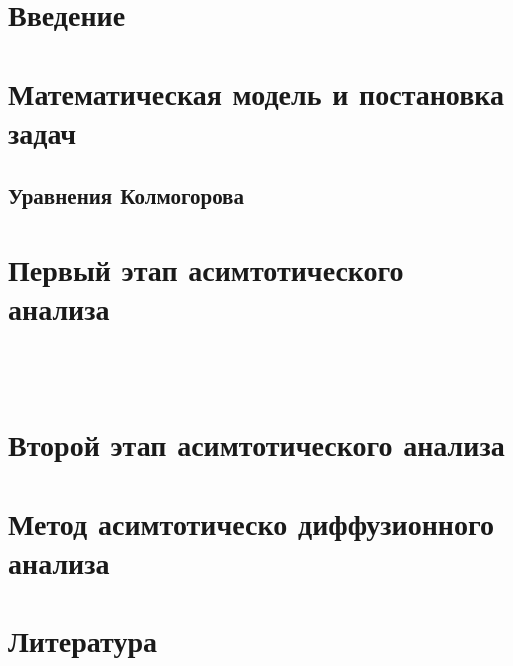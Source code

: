 \documentclass[a4paper,12pt]{article}
\begin{document}
	
	\newpage

	\tableofcontents
	\newpage
	

\section{Введение}

	
	\newpage
	

\section{Математическая модель и постановка задач}

	
	\newpage
	
	\begin{center}
		\section{Уравнения Колмогорова}
	\end{center}
	
	
	\newpage
	
	\newpage
	
\section{Первый этап асимтотического анализа}
	\\
	
	\\
	
	\newpage
	
\section{Второй этап асимтотического анализа}
	
	
	
	\newpage
	
\section{Метод асимтотическо диффузионного анализа}
	
	
	
	
	\newpage 

\section{Литература}
	
	\newpage
\end{document}
